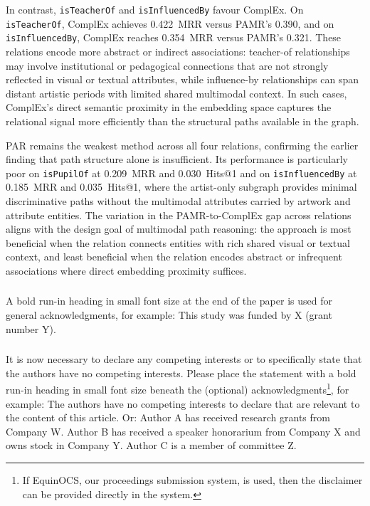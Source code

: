 \documentclass[runningheads]{llncs}
\begin{document}
In contrast, \texttt{isTeacherOf} and \texttt{isInfluencedBy} favour
ComplEx. On \texttt{isTeacherOf}, ComplEx achieves 0.422~MRR versus
PAMR's 0.390, and on \texttt{isInfluencedBy}, ComplEx reaches
0.354~MRR versus PAMR's 0.321. These relations encode more abstract
or indirect associations: teacher-of relationships may involve
institutional or pedagogical connections that are not strongly
reflected in visual or textual attributes, while influence-by
relationships can span distant artistic periods with limited shared
multimodal context. In such cases, ComplEx's direct semantic
proximity in the embedding space captures the relational signal more
efficiently than the structural paths available in the graph.

PAR remains the weakest method across all four relations, confirming
the earlier finding that path structure alone is insufficient. Its
performance is particularly poor on \texttt{isPupilOf} at 0.209~MRR and
0.030~Hits@1 and on \texttt{isInfluencedBy} at 0.185~MRR and 0.035~Hits@1,
where the artist-only subgraph provides minimal discriminative paths
without the multimodal attributes carried by artwork and attribute
entities. The variation in the PAMR-to-ComplEx gap across relations
aligns with the design goal of multimodal path reasoning: the approach
is most beneficial when the relation connects entities with rich shared
visual or textual context, and least beneficial when the relation
encodes abstract or infrequent associations where direct embedding
proximity suffices.

\begin{credits}
  \subsubsection{\ackname} A bold run-in heading in small font size at the end of the paper is
  used for general acknowledgments, for example: This study was funded
  by X (grant number Y).

  \subsubsection{\discintname}
  It is now necessary to declare any competing interests or to specifically
  state that the authors have no competing interests. Please place the
  statement with a bold run-in heading in small font size beneath the
  (optional) acknowledgments\footnote{If EquinOCS, our proceedings submission
  system, is used, then the disclaimer can be provided directly in the system.},
  for example: The authors have no competing interests to declare that are
  relevant to the content of this article. Or: Author A has received research
  grants from Company W. Author B has received a speaker honorarium from
  Company X and owns stock in Company Y. Author C is a member of committee Z.
\end{credits}
%
%
%


\end{document}
